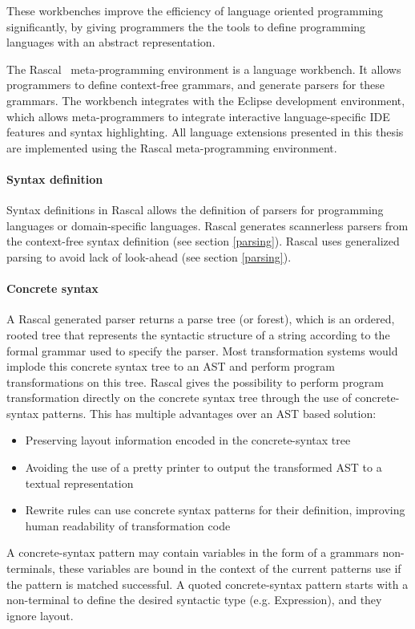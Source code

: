 These workbenches improve the efficiency of language oriented programming~\cite{Ward1994} significantly, by giving programmers the the tools to define programming languages with an abstract representation.

The Rascal~\cite{Klinta} meta-programming environment is a language workbench. It allows programmers to define context-free grammars, and generate parsers for these grammars. The workbench integrates with the Eclipse development environment, which allows meta-programmers to integrate interactive language-specific IDE features and syntax highlighting. All language extensions presented in this thesis are implemented using the Rascal meta-programming environment.

\paragraph{Syntax definition}
Syntax definitions in Rascal allows the definition of parsers for programming languages or domain-specific languages. Rascal generates scannerless parsers from the context-free syntax definition (see section \ref{parsing}). Rascal uses generalized parsing to avoid lack of look-ahead (see section \ref{parsing}).

\paragraph{Concrete syntax}
A Rascal generated parser returns a parse tree (or forest), which is an ordered, rooted tree that represents the syntactic structure of a string according to the formal grammar used to specify the parser. Most transformation systems would implode this concrete syntax tree to an AST and perform program transformations on this tree. Rascal gives the possibility to perform program transformation directly on the concrete syntax tree through the use of concrete-syntax patterns. This has multiple advantages over an AST based solution:
\begin{itemize}
	\item Preserving layout information encoded in the concrete-syntax tree
	\item Avoiding the use of a pretty printer to output the transformed AST to a textual representation
	\item Rewrite rules can use concrete syntax patterns for their definition, improving human readability of transformation code
\end{itemize}
A concrete-syntax pattern may contain variables in the form of a grammars non-terminals, these variables are bound in the context of the current patterns use if the pattern is matched successful. A quoted concrete-syntax pattern starts with a non-terminal to define the desired syntactic type (e.g. Expression), and they ignore layout.

